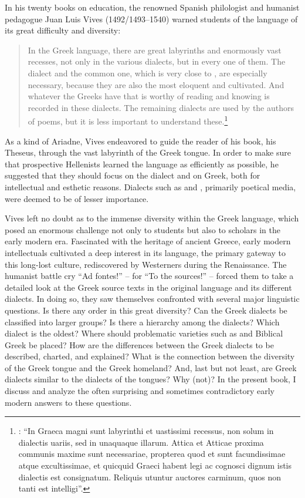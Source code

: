 \addchap{\lsPrefaceTitle}\label{ch:preface}

In his twenty books on education, the renowned Spanish philologist and humanist pedagogue Juan Luis Vives (1492/1493–1540) warned students of the  language of its great difficulty and diversity:

\begin{quote}
In the Greek language, there are great labyrinths and enormously vast recesses, not only in the various dialects, but in every one of them. The  dialect and the common one, which is very close to , are especially necessary, because they are also the most eloquent and cultivated. And whatever the Greeks have that is worthy of reading and knowing is recorded in these dialects. The remaining dialects are used by the authors of poems, but it is less important to understand these.\footnote{\citet[e3\textsuperscript{v}]{Vives1531}: “In Graeca magni sunt labyrinthi et uastissimi recessus, non solum in dialectis uariis, sed in unaquaque illarum. Attica et Atticae proxima communis maxime sunt necessariae, propterea quod et sunt facundissimae atque excultissimae, et quicquid Graeci habent legi ac cognosci dignum istis dialectis est consignatum. Reliquis utuntur auctores carminum, quos non tanti est intelligi”.}
\end{quote}

As a kind of Ariadne, Vives endeavored to guide the reader of his book, his Theseus, through the vast labyrinth of the Greek tongue. In order to make sure that prospective Hellenists learned the language as efficiently as possible, he suggested that they should focus on the  dialect and on  Greek, both for intellectual and esthetic reasons. Dialects such as  and , primarily poetical media, were deemed to be of lesser importance.

Vives left no doubt as to the immense diversity within the Greek language, which posed an enormous challenge not only to students but also to scholars in the early modern era. Fascinated with the heritage of ancient Greece, early modern intellectuals cultivated a deep interest in its language, the primary gateway to this long-lost culture, rediscovered by Westerners during the Renaissance. The humanist battle cry “Ad fontes!” –  for “To the sources!” – forced them to take a detailed look at the Greek source texts in the original language and its different dialects. In doing so, they saw themselves confronted with several major linguistic questions. Is there any order in this great diversity? Can the Greek dialects be classified into larger groups? Is there a hierarchy among the dialects? Which dialect is the oldest? Where should problematic varieties such as  and Biblical Greek be placed? How are the differences between the Greek dialects to be described, charted, and explained? What is the connection between the diversity of the Greek tongue and the Greek homeland? And, last but not least, are Greek dialects similar to the dialects of the  tongues? Why (not)? In the present book, I discuss and analyze the often surprising and sometimes contradictory early modern answers to these questions.

